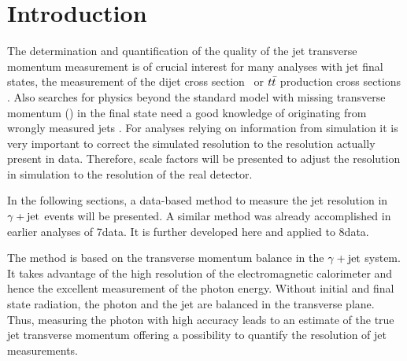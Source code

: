 \chapter{Introduction}
\label{ch:Introduction}

The determination and quantification of the quality of the jet transverse momentum measurement is of crucial interest for many analyses with jet final states, 
\eg the measurement of the dijet cross section~\cite{bib:CMS:QCD_measurements} or $t\bar{t}$ production cross sections \cite{bib:CMS:TopCrossSection_8TeV}. 
Also searches for physics beyond the standard model with missing transverse momentum (\PTm) in the final state need a good knowledge of \PTm originating from wrongly measured jets \cite{}.
For analyses relying on information from simulation it is very important to correct the simulated resolution to the resolution actually present in data.
Therefore, scale factors will be presented to adjust the resolution in simulation to the resolution of the real detector.  
  
In the following sections, a data-based method to measure the jet \pt resolution in $\gamma + \text{jet}$ events will be presented. 
A similar method was already accomplished in earlier analyses \cite{bib:CMS:JERCPaper_2011,bib:CMS-AN-2010-076,bib:CMS-AN-2010-141,bib:CMS-AN-2011-004} of 7\tev data.  
It is further developed here and applied to 8\tev data.

The method is based on the transverse momentum balance in the $\gamma + \text{jet}$ system. 
It takes advantage of the high resolution of the electromagnetic calorimeter and hence the excellent measurement of the photon energy.
Without initial and final state radiation, the photon and the jet are balanced in the transverse plane. 
Thus, measuring the photon \pt with high accuracy leads to an estimate of the true jet transverse momentum offering a possibility to quantify the resolution of jet \pt measurements.


